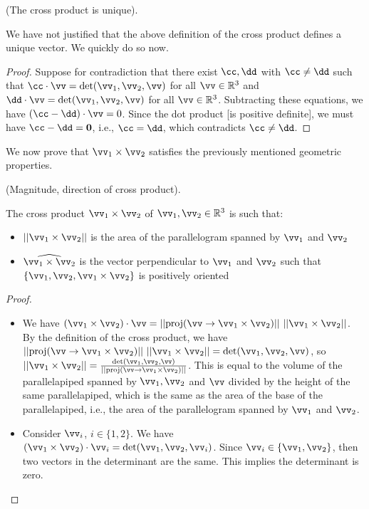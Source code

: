 \begin{remark}
    (The cross product is unique).

    We have not justified that the above definition of the cross product defines a unique vector. We quickly do so now.
\end{remark}

\begin{proof}
    Suppose for contradiction that there exist $\cc, \dd$ with $\cc \neq \dd$ such that $\cc \cdot \vv = \det(\vv_1, \vv_2, \vv)$ for all $\vv \in \R^3$ and $\dd \cdot \vv = \det(\vv_1, \vv_2, \vv)$ for all $\vv \in \R^3$. Subtracting these equations, we have $(\cc - \dd) \cdot \vv = 0$. Since the dot product [is positive definite], we must have $\cc - \dd = \mathbf{0}$, i.e., $\cc = \dd$, which contradicts $\cc \neq \dd$.
\end{proof}

We now prove that $\vv_1 \times \vv_2$ satisfies the previously mentioned geometric properties.

\begin{theorem}
    (Magnitude, direction of cross product).
    
    The cross product $\vv_1 \times \vv_2$ of  $\vv_1, \vv_2 \in \R^3$ is such that:
    
    \begin{itemize}
        \item $||\vv_1 \times \vv_2||$ is the area of the parallelogram spanned by $\vv_1$ and $\vv_2$
        \item $\widehat{\vv_1 \times \vv_2}$ is the vector perpendicular to $\vv_1$ and $\vv_2$ such that $\{\vv_1, \vv_2, \vv_1 \times \vv_2\}$ is positively oriented
    \end{itemize}
\end{theorem}

\begin{proof}
    \hspace{0mm} \\
    \begin{itemize}
        \item We have $(\vv_1 \times \vv_2) \cdot \vv = ||\proj(\vv \rightarrow \vv_1 \times \vv_2)|| \spc ||\vv_1 \times \vv_2||$. By the definition of the cross product, we have $||\proj(\vv \rightarrow \vv_1 \times \vv_2)|| \spc ||\vv_1 \times \vv_2|| = \det(\vv_1, \vv_2, \vv)$, so $||\vv_1 \times \vv_2|| = \frac{\det(\vv_1, \vv_2, \vv)}{||\proj(\vv \rightarrow \vv_1 \times \vv_2)||}$. This is equal to the volume of the parallelapiped spanned by $\vv_1, \vv_2$ and $\vv$ divided by the height of the same parallelapiped, which is the same as the area of the base of the parallelapiped, i.e., the area of the parallelogram spanned by $\vv_1$ and $\vv_2$.
        \item Consider $\vv_i$, $i \in \{1, 2\}$. We have $(\vv_1 \times \vv_2) \cdot \vv_i = \det(\vv_1, \vv_2, \vv_i)$. Since $\vv_i \in \{\vv_1, \vv_2\}$, then two vectors in the determinant are the same. This implies the determinant is zero.
    \end{itemize}
\end{proof}

